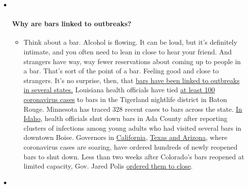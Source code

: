\begin{itemize}
\item ~
  \hypertarget{why-are-bars-linked-to-outbreaks}{%
  \paragraph{Why are bars linked to
  outbreaks?}\label{why-are-bars-linked-to-outbreaks}}

  \begin{itemize}
  \tightlist
  \item
    Think about a bar. Alcohol is flowing. It can be loud, but it's
    definitely intimate, and you often need to lean in close to hear
    your friend. And strangers have way, way fewer reservations about
    coming up to people in a bar. That's sort of the point of a bar.
    Feeling good and close to strangers. It's no surprise, then, that
    \href{https://www.nytimes.com/2020/07/02/us/coronavirus-bars.html?action=click\&pgtype=Article\&state=default\&region=MAIN_CONTENT_3\&context=storylines_faq}{bars
    have been linked to outbreaks in several states.} Louisiana health
    officials have tied
    \href{https://www.nytimes.com/2020/06/22/us/new-coronavirus-phase.html?action=click\&pgtype=Article\&state=default\&region=MAIN_CONTENT_3\&context=storylines_faq}{at
    least 100 coronavirus cases} to bars in the Tigerland nightlife
    district in Baton Rouge. Minnesota has traced 328 recent cases to
    bars across the state.
    \href{https://www.boisestatepublicradio.org/post/bars-large-venues-close-ada-county-after-surge-coronavirus-prompts-rollback\#stream/0}{In
    Idaho}, health officials shut down bars in Ada County after
    reporting clusters of infections among young adults who had visited
    several bars in downtown Boise. Governors in
    \href{https://www.nytimes.com/2020/07/01/us/california-coronavirus-reopening.html?action=click\&pgtype=Article\&state=default\&region=MAIN_CONTENT_3\&context=storylines_faq}{California},
    \href{https://www.nytimes.com/2020/06/14/us/coronavirus-united-states.html?action=click\&pgtype=Article\&state=default\&region=MAIN_CONTENT_3\&context=storylines_faq}{Texas
    and Arizona}, where coronavirus cases are soaring, have ordered
    hundreds of newly reopened bars to shut down. Less than two weeks
    after Colorado's bars reopened at limited capacity, Gov. Jared Polis
    \href{https://www.denverpost.com/2020/06/30/colorado-bars-closed-coronavirus/}{ordered
    them to close}.
  \end{itemize}
\item ~
  \hypertarget{i-have-antibodies-am-i-now-immune}{%
}
\end{itemize}
